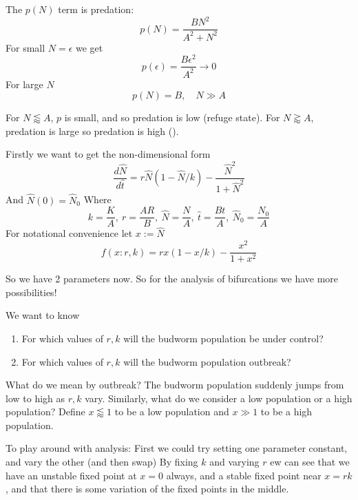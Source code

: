 \documentclass{/home/janmebows/Documents/LatexTemplates/myassignment}
\begin{document}
The $p(N)$ term is predation:
\[p(N) = \frac{BN^2}{A^2 + N^2}\]
For small $N = \epsilon$ we get
\[p(\epsilon) = \frac{B\epsilon^2}{A^2} \to 0\]
For large $N$
\[p(N) = B, \quad N\gg A\]

For $N \lessapprox  A$, $p$ is small, and so predation is low (refuge state). For $N \gtrapprox  A$, predation is large so predation is high ().



Firstly we want to get the non-dimensional form
\[\frac{d\hat{N}}{d\hat{t}} = r\hat{N} \left(1- \hat{N}/k\right) - \frac{\hat{N}^2}{1+\hat{N}^2}\]
And $\hat{N}(0) = \hat{N}_0$
Where
\[k = \frac KA,\ r = \frac{AR}{B},\ \hat{N} = \frac NA,\ \hat{t} = \frac{Bt}{A},\ \hat{N}_0 = \frac{N_0}A\]
For notational convenience let $x := \hat{N}$ 
\[f(x:r,k) = rx (1-x/k) - \frac{x^2}{1+x^2}\]


So we have 2 parameters now. So for the analysis of bifurcations we have more possibilities!

We want to know 
\begin{enumerate}
    \item For which values of $r,k$ will the budworm population be under control?
    \item For which values of $r,k$ will the budworm population outbreak?
\end{enumerate}
What do we mean by outbreak? The budworm population suddenly jumps from low to high as $r,k$ vary.
Similarly, what do we consider a low population or a high population? 
Define $x\lessapprox 1$ to be a low population and $x \gg 1$ to be a high population.

To play around with analysis:
First we could try setting one parameter constant, and vary the other (and then swap)
By fixing $k$ and varying $r$ ew can see that we have an unstable fixed point at $x=0$ always, and a stable fixed point near $x =rk$, and that there is some variation of the fixed points in the middle.

\end{document}
